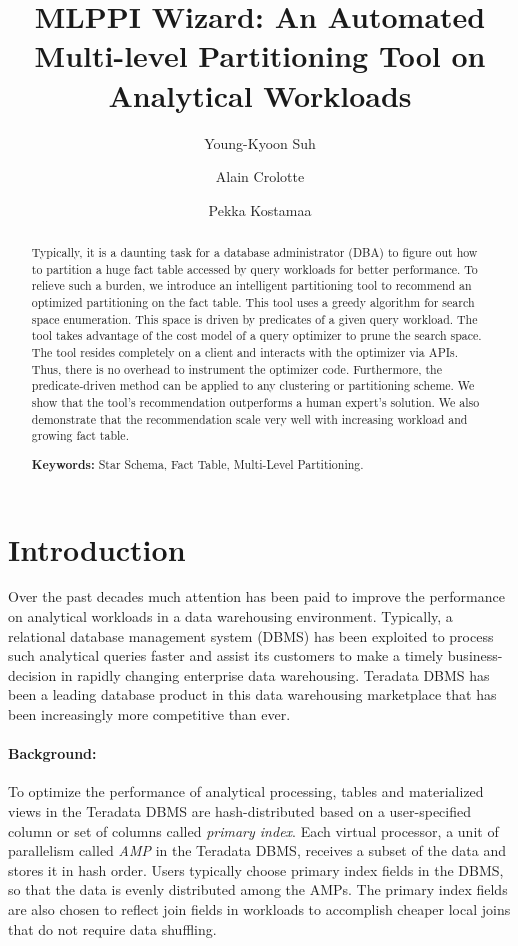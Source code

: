 \documentclass[runningheads]{comsis2}
\title{MLPPI Wizard: An Automated Multi-level Partitioning Tool on Analytical Workloads}
\author{Young-Kyoon Suh\inst{1} \and Alain Crolotte\inst{2} \and Pekka Kostamaa\inst{2}}
\institute{Department of Computer Science, The University of Arizona, Tucson, AZ 85721, USA\\ 
  \email{yksuh@cs.arizona.edu}
  \and
  Teradata Corporation, El Segundo, CA 90245, USA\\
  \email{\{alain.crolotte,pekka.kostamaa\}@teradata.com}
}
\begin{document}
\maketitle

\begin{abstract} 
Typically, it is a daunting task for a database administrator (DBA) to figure out how to partition a huge fact table accessed by query workloads for better performance. To relieve such a burden, we introduce an intelligent partitioning tool to recommend an optimized partitioning on the fact table. This tool uses a greedy algorithm for search space enumeration. This space is driven by predicates of a given query workload. The tool takes advantage of the cost model of a query optimizer to prune the search space. The tool resides completely on a client and interacts with the optimizer via APIs. Thus, there is no overhead to instrument the optimizer code. Furthermore, the predicate-driven method can be applied to any clustering or partitioning scheme. We show that the tool's recommendation outperforms a human expert's solution. We also demonstrate that the recommendation scale very well with increasing workload and growing fact table.

\vspace{6pt}\textbf{Keywords:} Star Schema, Fact Table, Multi-Level Partitioning.
\end{abstract}

\section{Introduction}
\label{sec:intro}

Over the past decades much attention has been paid 
to improve the performance on analytical workloads in a data warehousing environment. 
Typically, a relational database management system (\hbox{DBMS}) 
has been exploited to process such analytical queries faster 
and assist its customers to make a timely business-decision in 
rapidly changing enterprise data warehousing.
Teradata DBMS has been a leading database product in this data warehousing marketplace 
that has been increasingly more competitive than ever.


\paragraph{Background:} 
To optimize the performance of analytical processing, 
tables and materialized views in the Teradata DBMS are hash-distributed based 
on a user-specified column or set of columns called {\em primary index}. 
Each virtual processor, a unit of parallelism called {\em AMP} in 
the \hbox{Teradata} \hbox{DBMS}, 
receives a subset of the data and stores it in hash order. 
Users typically choose primary index fields in the DBMS, 
so that the data is evenly distributed among the AMPs. 
The primary index fields are also chosen to reflect join fields 
in workloads to accomplish cheaper local joins that do not require data shuffling. 
\end{document}
